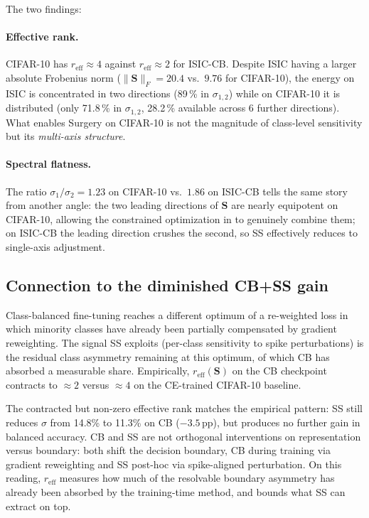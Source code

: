 \documentclass[11pt,a4paper]{article}
\newcommand{\norm}[1]{\lVert #1 \rVert}
\newcommand{\mat}[1]{\bm{#1}}
\begin{document}
The two findings:

\paragraph{Effective rank.} CIFAR-10 has $r_{\mathrm{eff}} \approx 4$
against $r_{\mathrm{eff}} \approx 2$ for ISIC-CB. Despite ISIC having
a larger absolute Frobenius norm ($\norm{\mat{S}}_F = 20.4$ vs.\
$9.76$ for CIFAR-10), the energy on ISIC is concentrated in two
directions (89\,\% in $\sigma_{1,2}$) while on CIFAR-10 it is
distributed (only 71.8\,\% in $\sigma_{1,2}$, 28.2\,\% available
across 6 further directions). What enables Surgery on CIFAR-10 is
not the magnitude of class-level sensitivity but its
\emph{multi-axis structure}.

\paragraph{Spectral flatness.} The ratio $\sigma_1/\sigma_2 = 1.23$
on CIFAR-10 vs.\ $1.86$ on ISIC-CB tells the same story from another
angle: the two leading directions of $\mat{S}$ are nearly equipotent
on CIFAR-10, allowing the constrained optimization in
 to genuinely combine them; on ISIC-CB the leading
direction crushes the second, so SS effectively reduces to
single-axis adjustment.

\subsection{Connection to the diminished CB+SS gain}

Class-balanced fine-tuning reaches a different optimum of a
re-weighted loss in which minority classes have already been partially
compensated by gradient reweighting. The signal SS exploits (per-class
sensitivity to spike perturbations) is the residual class asymmetry
remaining at this optimum, of which CB has absorbed a measurable share.
Empirically, $r_{\mathrm{eff}}(\mat{S})$ on the CB checkpoint
contracts to $\approx 2$ versus $\approx 4$ on the CE-trained CIFAR-10
baseline.

The contracted but non-zero effective rank matches the empirical
pattern: SS still reduces $\sigma$ from 14.8\% to 11.3\% on CB
($-3.5$\,pp), but produces no further gain in balanced accuracy. CB
and SS are not orthogonal interventions on representation versus
boundary: both shift the decision boundary, CB during training via
gradient reweighting and SS post-hoc via spike-aligned perturbation.
On this reading, $r_{\mathrm{eff}}$ measures how much of the
resolvable boundary asymmetry has already been absorbed by the
training-time method, and bounds what SS can extract on top.
\end{document}

